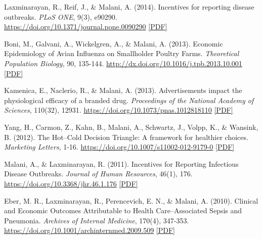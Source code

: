\begin{tablist}
        \item[2014] \tab{}Laxminarayan, R., Reif, J., \& Malani, A. (2014). Incentives for reporting disease outbreaks. \textit{PLoS ONE}, 9(3), e90290. \href{https://doi.org/10.1371/journal.pone.0090290}{https://doi.org/10.1371/journal.pone.0090290} \href{https://github.com/anup-malani/website_personal/blob/main/publications/2014_LaxminarayanReifMalani_PLOSOne_IncentivesDiseaseReporting.pdf}{[PDF]}

        \item[2013] \tab{}Boni, M., Galvani, A., Wickelgren, A., \& Malani, A. (2013). Economic Epidemiology of Avian Influenza on Smallholder Poultry Farms. \textit{Theoretical Population Biology}, 90, 135-144. \href{http://dx.doi.org/10.1016/j.tpb.2013.10.001}{http://dx.doi.org/10.1016/j.tpb.2013.10.001} \href{https://github.com/anup-malani/website_personal/blob/main/publications/2013_BoniMalani_AvianFlu.pdf}{[PDF]}
    
        \item[2013] \tab{}Kamenica, E., Naclerio, R., \& Malani, A. (2013). Advertisements impact the physiological efficacy of a branded drug. \textit{Proceedings of the National Academy of Sciences}, 110(32), 12931. \href{https://doi.org/10.1073/pnas.1012818110}{https://doi.org/10.1073/pnas.1012818110} \href{https://github.com/anup-malani/website_personal/blob/main/publications/2013_KamenicaMalani_PNAS_PlaceboAds.pdf}{[PDF]} 

        \item[2012] \tab{}Yang, H., Carmon, Z., Kahn, B., Malani, A., Schwartz, J., Volpp, K., \& Wansink, B. (2012). The Hot–Cold Decision Triangle: A framework for healthier choices. \textit{Marketing Letters}, 1-16. \href{https://doi.org/10.1007/s11002-012-9179-0}{https://doi.org/10.1007/s11002-012-9179-0} \href{https://github.com/anup-malani/website_personal/blob/main/publications/2012_YangMalani_MarketingLetters_HotColdTriangle.pdf}{[PDF]}  
    
        \item[2011] \tab{}Malani, A., \& Laxminarayan, R. (2011). Incentives for Reporting Infectious Disease Outbreaks. \textit{Journal of Human Resources}, 46(1), 176. \href{https://doi.org/10.3368/jhr.46.1.176}{https://doi.org/10.3368/jhr.46.1.176} \href{https://github.com/anup-malani/website_personal/blob/main/publications/2011_MalaniLaxminarayan_JHR_IncentivesDiseaseReporting.pdf}{[PDF]} 
    
        \item[2010] \tab{}Eber, M. R., Laxminarayan, R., Perencevich, E. N., \& Malani, A. (2010). Clinical and Economic Outcomes Attributable to Health Care–Associated Sepsis and Pneumonia. \textit{Archives of Internal Medicine}, 170(4), 347-353. \href{https://doi.org/10.1001/archinternmed.2009.509}{https://doi.org/10.1001/archinternmed.2009.509} \href{https://github.com/anup-malani/website_personal/blob/main/publications/2010_EberMalani_ArchiveIntMed_HAI.pdf}{[PDF]} 
        

\end{tablist}
